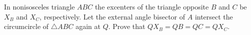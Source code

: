 In nonisosceles triangle $ABC$ the excenters of the triangle opposite $B$ and $C$ be $X_B$ and $X_C$, respectively. Let the external angle bisector of $A$ intersect the circumcircle of $\triangle ABC$ again at $Q$. Prove that $QX_B = QB = QC = QX_C$.